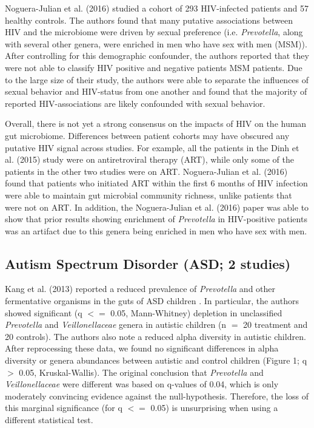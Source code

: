 \documentclass{article}
\begin{document}
{Noguera-Julian et al. (2016) studied a cohort of 293 HIV-infected patients and 57 healthy controls. 
The authors found that many putative associations between HIV and the microbiome were driven by sexual preference (i.e. \textit{Prevotella}, along with several other genera, were enriched in men who have sex with men (MSM)). 
After controlling for this demographic confounder, the authors reported that they were not able to classify HIV positive and negative patients MSM patients. 
Due to the large size of their study, the authors were able to separate the influences of sexual behavior and HIV-status from one another and found that the majority of reported HIV-associations are likely confounded with sexual behavior. 

Overall, there is not yet a strong consensus on the impacts of HIV on the human gut microbiome. 
Differences between patient cohorts may have obscured any putative HIV signal across studies. 
For example, all the patients in the Dinh et al. (2015) study were on antiretroviral therapy (ART), while only some of the patients in the other two studies were on ART. 
Noguera-Julian et al. (2016) found that patients who initiated ART within the first 6 months of HIV infection were able to maintain gut microbial community richness, unlike patients that were not on ART. 
In addition, the Noguera-Julian et al. (2016) paper was able to show that prior results showing enrichment of \textit{Prevotella} in HIV-positive patients was an artifact due to this genera being enriched in men who have sex with men.

\subsection*{Autism Spectrum Disorder (ASD; 2 studies)}

Kang et al. (2013) reported a reduced prevalence of \textit{Prevotella} and other fermentative organisms in the guts of ASD children \cite{asd-kb}. 
In particular, the authors showed significant (q $<=$ 0.05, Mann-Whitney) depletion in unclassified \textit{Prevotella} and \textit{Veillonellaceae} genera in autistic children (n $=$ 20 treatment and 20 controls). 
The authors also note a reduced alpha diversity in autistic children. 
After reprocessing these data, we found no significant differences in alpha diversity or genera abundances between autistic and control children (Figure 1; q $>$ 0.05, Kruskal-Wallis). 
The original conclusion that \textit{Prevotella} and \textit{Veillonellaceae} were different was based on q-values of 0.04, which is only moderately convincing evidence against the null-hypothesis. 
Therefore, the loss of this marginal significance (for q $<=$ 0.05) is unsurprising when using a different statistical test.

}
\end{document}
